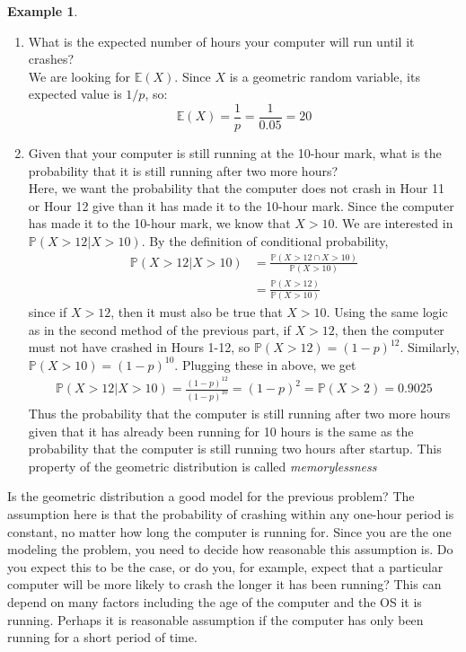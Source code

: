 \documentclass[12pt]{article}
\theoremstyle{definition}
\newtheorem*{example}{Example}
\theoremstyle{remark}
\def\P{{\mathbb P}}
\def\E{{\mathbb E}}
\begin{document}
\begin{example}
\begin{enumerate}
\item What is the expected number of hours your computer will run until it crashes?\\

We are looking for $\E(X)$. Since $X$ is a geometric random variable, its expected value is $1/p$, so:
\[
\E(X) = \frac{1}{p} = \frac{1}{0.05} = 20
\]

\item Given that your computer is still running at the 10-hour mark, what is the probability that it is still running after two more hours?\\

Here, we want the probability that the computer does not crash in Hour 11 or Hour 12 give than it has made it to the 10-hour mark. Since the computer has made it to the 10-hour mark, we know that $X > 10$. We are interested in $\P(X > 12 | X > 10)$. By the definition of conditional probability,
\begin{align*}
\P(X > 12 | X > 10) &= \frac{\P(X > 12 \cap X > 10)}{\P(X>10)}\\
&= \frac{\P(X > 12)}{\P(X>10)}
\end{align*}
since if $X > 12$, then it must also be true that $X > 10$. Using the same logic as in the second method of the previous part, if $X>12$, then the computer must not have crashed in Hours 1-12, so $\P(X > 12) = (1-p)^{12}$. Similarly, $\P(X > 10) = (1-p)^{10}$. Plugging these in above, we get
\begin{align*}
\P(X > 12 | X > 10) = \frac{(1-p)^{12}}{(1-p)^{10}} = (1-p)^2 = \P(X > 2) = 0.9025
\end{align*}
Thus the probability that the computer is still running after two more hours given that it has already been running for 10 hours is the same as the probability that the computer is still running two hours after startup. This property of the geometric distribution is called \emph{memorylessness}
\end{enumerate}
\end{example}

Is the geometric distribution a good model for the previous problem? The assumption here is that the probability of crashing within any one-hour period is constant, no matter how long the computer is running for. Since you are the one modeling the problem, you need to decide how reasonable this assumption is. Do you expect this to be the case, or do you, for example, expect that a particular computer will be more likely to crash the longer it has been running? This can depend on many factors including the age of the computer and the OS it is running. Perhaps it is reasonable assumption if the computer has only been running for a short period of time. \\
\end{document}
